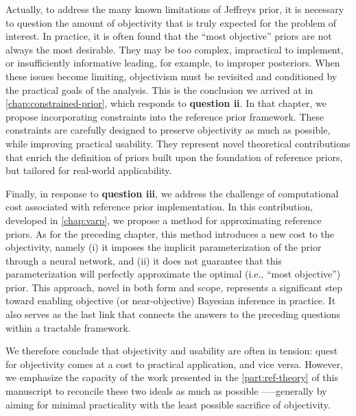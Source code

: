 Actually, to address the many known limitations of Jeffreys prior, it is necessary to question the amount of objectivity that is truly expected for the problem of interest. %
In practice, it is often found that the ``most objective'' priors are not always the most desirable. They may be too complex, impractical to implement, or insufficiently informative leading, for example, to improper posteriors. When these issues become limiting, objectivism must be revisited and conditioned by the practical goals of the analysis. This is the conclusion we arrived at in \cref{chap:constrained-prior}, which responds to \textbf{question ii}.
In that chapter, we propose incorporating constraints into the reference prior framework. These constraints are carefully designed to preserve objectivity as much as possible, while improving practical usability. They represent novel theoretical contributions that enrich the definition of priors built upon the foundation of reference priors, but tailored for real-world applicability.

Finally, in response to \textbf{question iii}, we address the challenge of computational cost associated with reference prior implementation. In this contribution, developed in \cref{chap:varp}, we propose a method for approximating reference priors. As for the preceding chapter, this method introduces a new cost to the objectivity, namely (i) it imposes the implicit parameterization of the prior through a neural network, and (ii) it does not guarantee that this parameterization will perfectly approximate the optimal (i.e., ``most objective'') prior. %
This approach, novel in both form and scope, represents a significant step toward enabling objective (or near-objective) Bayesian inference in practice. It also serves as the last link that connects the answers to the preceding questions within a tractable framework.

We therefore conclude that objectivity and usability are often in tension: quest for objectivity comes at a cost to practical application, and vice versa. However, we emphasize the capacity of the work presented in the \cref{part:ref-theory} of this manuscript to reconcile these two ideals as much as possible —--generally by aiming for minimal practicality with the least possible sacrifice of objectivity.











